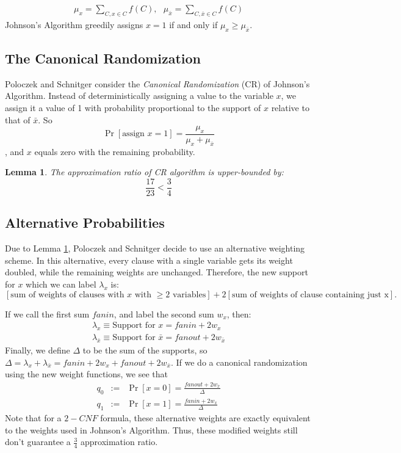\documentclass[11pt,letter]{article}
\newtheorem{lemma}{Lemma}
\begin{document}
\begin{align*}
\mu_x = \sum_{C,x\in C}f(C), \,\,\,\, \mu_{\bar{x}} =\sum_{C,\bar{x}\in C}f(C)
\end{align*}
Johnson's Algorithm greedily assigns $x=1$ if and only if $\mu_x \ge \mu_{\bar{x}}$.

\subsection{The Canonical Randomization}
Poloczek and Schnitger consider the \textit{Canonical Randomization} (CR) of Johnson's Algorithm. Instead of deterministically assigning a value to the variable $x$, we assign it a value of 1 with probability proportional to the support of $x$ relative to that of $\bar{x}$. So
$$ \Pr[\text{assign } x=1] = \frac{\mu_x}{\mu_x + \mu_{\bar{x}}}$$, and $x$ equals zero with the remaining probability.

\begin{lemma}
\label{L:1}
The approximation ratio of CR algorithm is upper-bounded by:
$$\frac{17}{23} < \frac{3}{4}$$

\end{lemma}

\subsection{Alternative Probabilities}
Due to Lemma \ref{L:1}, Poloczek and Schnitger decide to use an alternative weighting scheme. In this alternative, every clause with a single variable gets its weight doubled, while the remaining weights are unchanged. Therefore, the new support for $x$ which we can label $\lambda_x$ is:
$$[\text{sum of weights of clauses with $x$ with $\ge 2$ variables}] + 2[\text{sum of weights of clause containing just x}].$$

If we call the first sum $fanin$, and label the second sum $w_x$, then:
\begin{eqnarray*}
\lambda_x \equiv \text{Support for } x = fanin + 2w_x\\
\lambda_{\bar{x}} \equiv \text{Support for } \bar{x} = fanout + 2w_{\bar{x}}
\end{eqnarray*}
Finally, we define $\Delta$ to be the sum of the supports, so $\Delta = \lambda_{x} + \lambda_{\bar{x}} = fanin + 2w_x + fanout + 2w_{\bar{x}}$. If we do a canonical randomization  using the new weight functions, we see that
\begin{eqnarray*}
q_0 &:=& \Pr[x=0] = \frac{fanout + 2w_{\bar{x}}}{\Delta}\\
q_1 &:=& \Pr[x=1] = \frac{fanin + 2w_x}{\Delta}
\end{eqnarray*}
Note that for a $2-CNF$ formula, these alternative weights are exactly equivalent to the weights used in Johnson's Algorithm. Thus, these modified weights still don't guarantee a $\frac{3}{4}$ approximation ratio.
\end{document}
